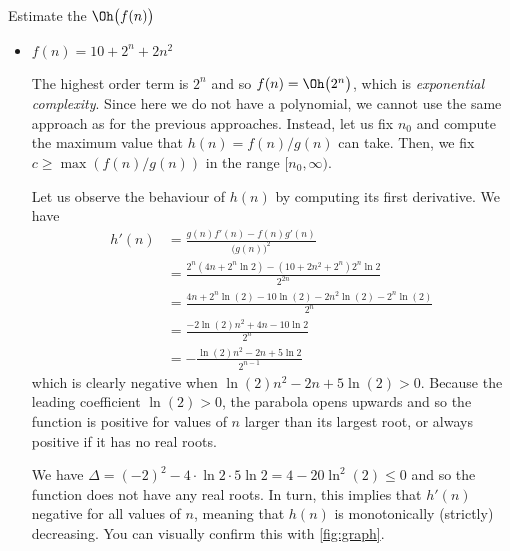 \documentclass{practice}
\begin{document}
\begin{task}{Estimate the $\Oh\bigl(f(n)\bigr)$}
\begin{itemize}
    Because both sides of the inequality are positive for $n \ge 1$, we can take the logarithm on both sides.
    We have
    \begin{align*}
      \log\bigl(n\bigl(11 + 0.2n^2\bigr)\bigr) &\le \log(9\cdot2^n)\\
      \log(n) + \log\bigl(11+0.2n^2\bigr) &\le \log(9) + \log\bigl(2^n\bigr)\\
      \log(n) + \log\bigl(11+0.2n^2\bigr) &\le \log(9) + n\\
      2^{\log(n) + \log\bigl(11+0.2n^2\bigr)} &\le 2^{\log(9) + n}\\
    \end{align*}

    Recall that
    \[
      \log_b(b^x) = x
    \]
    \fi

    \item $f(n) = 10 + 2^n + 2n^2$
    
    The highest order term is $2^n$ and so $f(n) = \Oh\bigl(2^n\bigr)$, which is \emph{exponential complexity}.
    Since here we do not have a polynomial, we cannot use the same approach as for the previous approaches.
    Instead, let us fix $n_0$ and compute the maximum value that $h(n)=f(n)/g(n)$ can take.
    Then, we fix $c \ge \max(f(n)/g(n))$ in the range $[n_0, \infty)$.

    Let us observe the behaviour of $h(n)$ by computing its first derivative.
    We have
    \begin{align*}
      h'(n) &= \frac{g(n)f'(n)-f(n)g'(n)}{\bigl(g(n)\bigr)^2}\\
      &= \frac{
        2^n(4n + 2^n\ln2) -
        (10 + 2n^2 + 2^n)2^n\ln2
        }{2^{2n}}\\
      &= \frac{4n + 2^n\ln(2) - 10\ln(2) - 2n^2\ln(2) - 2^n\ln(2)}{2^n}\\
      &= \frac{-2\ln(2)n^2 +4n - 10\ln2}{2^n}\\
      &= -\frac{\ln(2)n^2 - 2n + 5\ln2}{2^{n-1}}
    \end{align*}
    which is clearly negative when $\ln(2)n^2 -2n + 5\ln(2)>0$.
    Because the leading coefficient $\ln(2)>0$, the parabola opens upwards and so the function is positive for values of $n$ larger than its largest root, or always positive if it has no real roots.

    We have $\Delta = (-2)^2 - 4 \cdot \ln{2} \cdot 5\ln{2} = 4 - 20\ln^2(2) \le 0$ and so the function does not have any real roots.
    In turn, this implies that $h'(n)$ negative for all values of $n$, meaning that $h(n)$ is monotonically (strictly) decreasing.
    You can visually confirm this with \autoref{fig:graph}.


\end{itemize}
\end{task}
\end{document}
